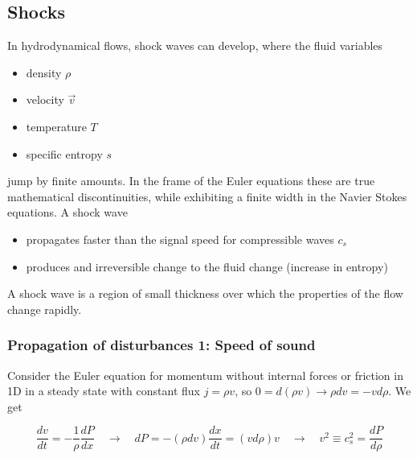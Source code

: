 \subsection{Shocks}
In hydrodynamical flows, shock waves can develop, where the fluid variables
\begin{itemize}
    \item density $\rho$
    \item velocity $\vec{v}$
    \item temperature $T$
    \item specific entropy $s$
\end{itemize}
jump by finite amounts. In the frame of the Euler equations these are
true mathematical discontinuities, while exhibiting a finite width in the Navier Stokes equations. A shock wave
\begin{itemize}
    \item propagates faster than the signal speed for compressible waves $c_s$
    \item produces and irreversible change to the fluid change (increase in entropy)
\end{itemize}
A shock wave is a region of small thickness over which the properties of the flow change rapidly.

\subsubsection{Propagation of disturbances 1: Speed of sound}
Consider the Euler equation for momentum without internal forces
or friction in 1D in a steady state with constant flux $j = \rho v$, so
$0 = d(\rho v) \rightarrow \rho dv = -v d\rho$. We get

\begin{equation}
    \frac{dv}{dt} = -\frac{1}{\rho} \frac{dP}{dx} \quad \rightarrow \quad dP = -(\rho dv) \frac{dx}{dt} = (v d\rho) v \quad \rightarrow \quad v^2 \equiv c_s^2 = \frac{dP}{d\rho}
\end{equation}


